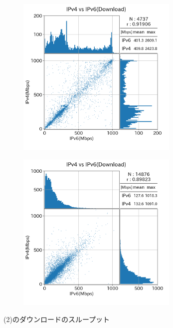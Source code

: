 \begin{figure}[htbp]
\begin{center}
\begin{minipage}[t]{0.48\textwidth}
\begin{subfigure}[b]{\textwidth}
                \label{new_FTTH_dl}
            \end{subfigure}
            \begin{subfigure}[b]{\textwidth}
                \centering
                \includegraphics[width=0.85\textwidth]{fig/new_CATV_dl.png}
                \label{new_CATV_dl}
            \end{subfigure}
            \begin{subfigure}[b]{\textwidth}
                \centering
                \includegraphics[width=0.85\textwidth]{fig/new_Mobile_dl.png}
                \label{new_Mobile_dl}
            \end{subfigure}
            \caption{(2)のダウンロードのスループット}
            \label{fig:new_Line_dl}
        \end{minipage}
    \end{center}
\end{figure}
\FloatBarrier

